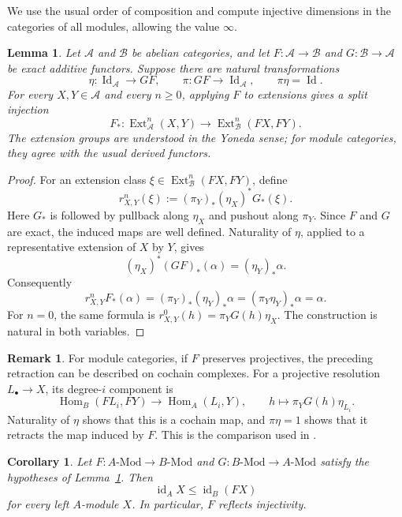 \documentclass[12pt,a4paper,english,reqno]{amsart}
\numberwithin{equation}{section}
\theoremstyle{plain}
\newtheorem{lemma}[theorem]{Lemma}
\newtheorem{corollary}[theorem]{Corollary}
\theoremstyle{definition}
\newtheorem{remark}[theorem]{Remark}
\begin{document}
We use the usual order of composition and compute injective dimensions
in the categories of all modules, allowing the value $\infty$.

\begin{lemma}
\label{lem:bel-ext-retract}
Let $\mathcal A$ and $\mathcal B$ be abelian categories, and let
$F\colon\mathcal A\to\mathcal B$ and
$G\colon\mathcal B\to\mathcal A$ be exact additive functors.  Suppose
there are natural transformations
\[
 \eta\colon\operatorname{Id}_{\mathcal A}\longrightarrow GF,
 \qquad
 \pi\colon GF\longrightarrow\operatorname{Id}_{\mathcal A},
 \qquad \pi\eta=\operatorname{Id}.
\]
For every $X,Y\in\mathcal A$ and every $n\geq0$, applying $F$ to
extensions gives a split injection
\[
 F_*\colon \operatorname{Ext}^n_{\mathcal A}(X,Y)
 \longrightarrow
 \operatorname{Ext}^n_{\mathcal B}(FX,FY).
\]
The extension groups are understood in the Yoneda sense; for module
categories, they agree with the usual derived functors.
\end{lemma}

\begin{proof}
For an extension class
$\xi\in\operatorname{Ext}^n_{\mathcal B}(FX,FY)$, define
\[
 r^n_{X,Y}(\xi)
   :=(\pi_Y)_*(\eta_X)^*G_*(\xi).
\]
Here $G_*$ is followed by pullback along $\eta_X$ and pushout along
$\pi_Y$.  Since $F$ and $G$ are exact, the induced maps are well defined.  Naturality
of $\eta$, applied to a representative extension of $X$ by $Y$, gives
\[
 (\eta_X)^*(GF)_*(\alpha)=(\eta_Y)_*\alpha.
\]
Consequently
\[
 r^n_{X,Y}F_*(\alpha)
   =(\pi_Y)_*(\eta_Y)_*\alpha
   =(\pi_Y\eta_Y)_*\alpha
   =\alpha.
\]
For $n=0$, the same formula is
$r^0_{X,Y}(h)=\pi_YG(h)\eta_X$.  The construction is natural in both
variables.
\end{proof}

\begin{remark}
\label{rem:bel-cochain}
For module categories, if $F$ preserves projectives, the preceding
retraction can be described on cochain complexes.  For a projective
resolution $L_\bullet\to X$, its degree-$i$ component is
\[
 \operatorname{Hom}_{B}(F L_i,FY)
 \longrightarrow\operatorname{Hom}_{A}(L_i,Y),
 \qquad h\longmapsto\pi_YG(h)\eta_{L_i}.
\]
Naturality of $\eta$ shows that this is a cochain map, and
$\pi\eta=1$ shows that it retracts the map induced by $F$.  This is
the comparison used in \cite[proof of Theorem~1]{bel-Tang2026}.
\end{remark}

\begin{corollary}
\label{cor:bel-id-reflect}
Let $F:A\text{-}\mathrm{Mod}\to B\text{-}\mathrm{Mod}$ and
$G:B\text{-}\mathrm{Mod}\to A\text{-}\mathrm{Mod}$ satisfy the hypotheses
of Lemma~\ref{lem:bel-ext-retract}.  Then
\[
 \operatorname{id}_A X\leq \operatorname{id}_B(FX)
\]
for every left $A$-module $X$.  In particular, $F$ reflects injectivity.
\end{corollary}
\end{document}
